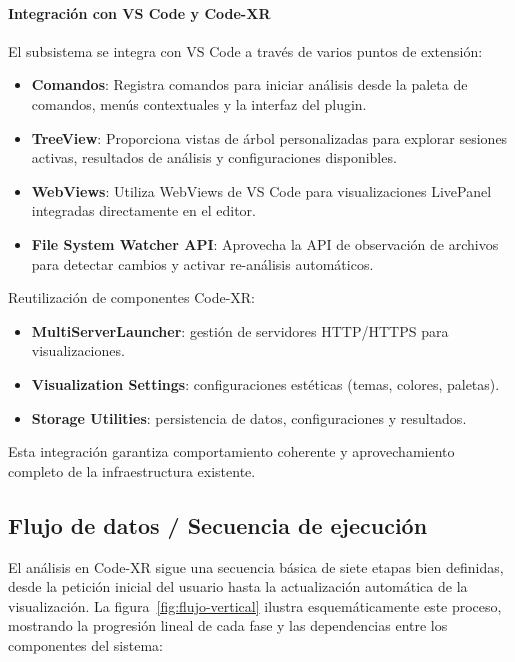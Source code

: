 \documentclass[a4paper, 12pt]{book}
\begin{document}
\paragraph{Integración con VS Code y Code-XR}
El subsistema se integra con VS Code a través de varios puntos de extensión:

\begin{itemize}
  \item \textbf{Comandos}: Registra comandos para iniciar análisis desde la paleta de comandos, menús contextuales y la interfaz del plugin.
  
  \item \textbf{TreeView}: Proporciona vistas de árbol personalizadas para explorar sesiones activas, resultados de análisis y configuraciones disponibles.
  
  \item \textbf{WebViews}: Utiliza WebViews de VS Code para visualizaciones LivePanel integradas directamente en el editor.
  
  \item \textbf{File System Watcher API}: Aprovecha la API de observación de archivos para detectar cambios y activar re-análisis automáticos.
\end{itemize}

Reutilización de componentes Code-XR:

\begin{itemize}
  \item \textbf{MultiServerLauncher}: gestión de servidores HTTP/HTTPS para visualizaciones.
  \item \textbf{Visualization Settings}: configuraciones estéticas (temas, colores, paletas).
  \item \textbf{Storage Utilities}: persistencia de datos, configuraciones y resultados.
\end{itemize}

Esta integración garantiza comportamiento coherente y aprovechamiento completo de la infraestructura existente.

\subsection{Flujo de datos / Secuencia de ejecución}
\label{sec:flujo-ejecucion}

El análisis en Code-XR sigue una secuencia básica de siete etapas bien definidas, desde la petición inicial del usuario hasta la actualización automática de la visualización. La figura~\ref{fig:flujo-vertical} ilustra esquemáticamente este proceso, mostrando la progresión lineal de cada fase y las dependencias entre los componentes del sistema:
\end{document}
